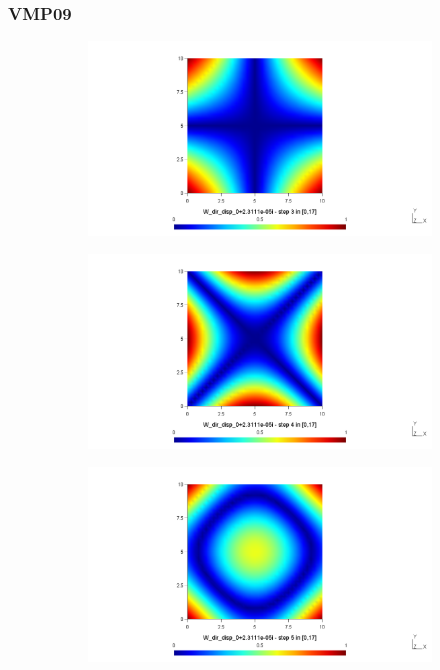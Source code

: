 \documentclass[9pt]{beamer}
\begin{document}
\begin{frame}
\frametitle{VMP09}

\begin{figure}[h!]
\begin{subfigure}{.3\textwidth}
\includegraphics[width=\linewidth,trim={8cm 4cm 8cm 2cm},clip]{VMP09_T12_pos_F4.png}
\end{subfigure} \hfill
\begin{subfigure}{.3\textwidth}
\includegraphics[width=\linewidth,trim={8cm 4cm 8cm 2cm},clip]{VMP09_T12_pos_F5.png}
\end{subfigure}\hfill
\begin{subfigure}{.3\textwidth}
\includegraphics[width=\linewidth,trim={8cm 4cm 8cm 2cm},clip]{VMP09_T12_pos_F6.png}

\end{subfigure}
\end{figure}
\end{frame}
\end{document}
